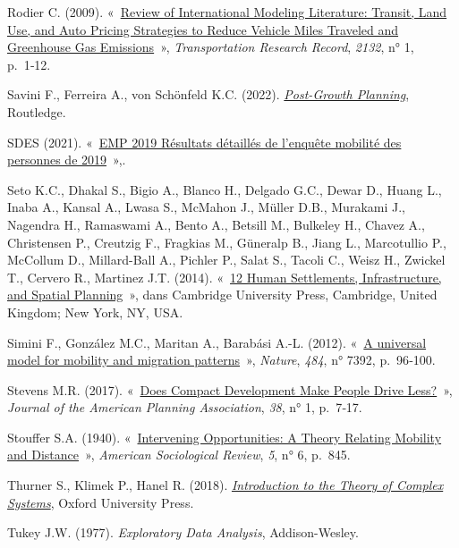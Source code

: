\documentclass[
  9pt,
  a4paper,
  DIV=11]{scrreprt}
\newlength{\cslhangindent}
\newenvironment{CSLReferences}[2] %
 {\begin{list}{}{%
  \setlength{\itemindent}{0pt}
  \setlength{\leftmargin}{0pt}
  \setlength{\parsep}{0pt}
  \ifodd #1
   \setlength{\leftmargin}{\cslhangindent}
   \setlength{\itemindent}{-1\cslhangindent}
  \fi
  \setlength{\itemsep}{#2\baselineskip}}}
 {\end{list}}
\begin{document}
\begin{CSLReferences}{0}{1}
Rodier C. (2009). {«~\href{https://doi.org/10.3141/2132-01}{Review of
International Modeling Literature: Transit, Land Use, and Auto Pricing
Strategies to Reduce Vehicle Miles Traveled and Greenhouse Gas
Emissions}~»}, \emph{Transportation Research Record}, \emph{2132}, n° 1,
p.~1‑12.

Savini F., Ferreira A., von Schönfeld K.C. (2022).
\emph{\href{https://doi.org/10.4324/9781003160984}{Post-Growth
Planning}}, Routledge.

SDES (2021).
{«~\href{https://www.statistiques.developpement-durable.gouv.fr/resultats-detailles-de-lenquete-mobilite-des-personnes-de-2019}{EMP
2019 Résultats détaillés de l'enquête mobilité des personnes de
2019}~»},.

Seto K.C., Dhakal S., Bigio A., Blanco H., Delgado G.C., Dewar D., Huang
L., Inaba A., Kansal A., Lwasa S., McMahon J., Müller D.B., Murakami J.,
Nagendra H., Ramaswami A., Bento A., Betsill M., Bulkeley H., Chavez A.,
Christensen P., Creutzig F., Fragkias M., Güneralp B., Jiang L.,
Marcotullio P., McCollum D., Millard-Ball A., Pichler P., Salat S.,
Tacoli C., Weisz H., Zwickel T., Cervero R., Martinez J.T. (2014).
{«~\href{https://www.ipcc.ch/site/assets/uploads/2018/02/ipcc_wg3_ar5_chapter12.pdf}{12
Human Settlements, Infrastructure, and Spatial Planning}~»}, dans
Cambridge University Press, Cambridge, United Kingdom; New York, NY,
USA.

Simini F., González M.C., Maritan A., Barabási A.-L. (2012).
{«~\href{https://doi.org/10.1038/nature10856}{A universal model for
mobility and migration patterns}~»}, \emph{Nature}, \emph{484}, n° 7392,
p.~96‑100.

Stevens M.R. (2017).
{«~\href{https://www.tandfonline.com/doi/epdf/10.1080/01944363.2016.1240044?needAccess=true&role=button}{Does
Compact Development Make People Drive Less?}~»}, \emph{Journal of the
American Planning Association}, \emph{38}, n° 1, p.~7‑17.

Stouffer S.A. (1940).
{«~\href{https://doi.org/10.2307/2084520}{Intervening Opportunities: A
Theory Relating Mobility and Distance}~»}, \emph{American Sociological
Review}, \emph{5}, n° 6, p.~845.

Thurner S., Klimek P., Hanel R. (2018).
\emph{\href{https://doi.org/10.1093/oso/9780198821939.001.0001}{Introduction
to the Theory of Complex Systems}}, Oxford University Press.

Tukey J.W. (1977). \emph{Exploratory Data Analysis}, Addison-Wesley.

\end{CSLReferences}
\end{document}
